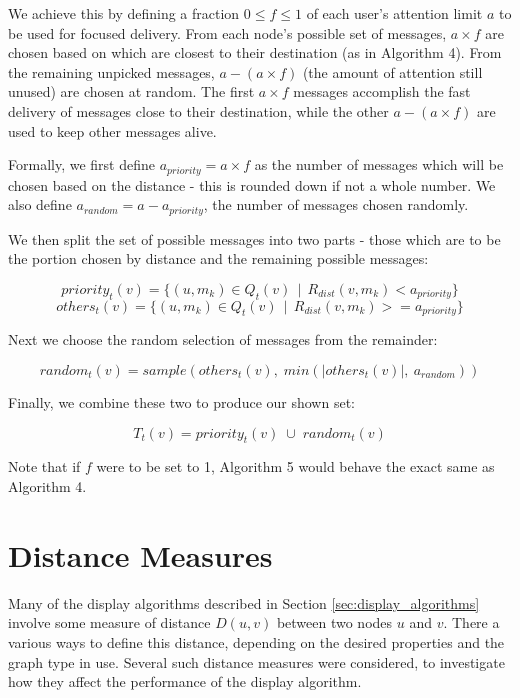 \documentclass[bsc,frontabs,twoside,singlespacing,parskip,deptreport]{infthesis}     %
\begin{document}
We achieve this by defining a fraction $0 \le f \le 1$ of each user's attention limit $a$ to be used for focused delivery. From each node's possible set of messages, $a \times f$ are chosen based on which are closest to their destination (as in Algorithm 4). From the remaining unpicked messages, $a - (a \times f)$ (the amount of attention still unused) are chosen at random. The first $a \times f$ messages accomplish the fast delivery of messages close to their destination, while the other $a - (a \times f)$ are used to keep other messages alive.

Formally, we first define $a_{priority} = a \times f$ as the number of messages which will be chosen based on the distance - this is rounded down if not a whole number. We also define $a_{random} = a - a_{priority}$, the number of messages chosen randomly.

We then split the set of possible messages into two parts - those which are to be the portion chosen by distance and the remaining possible messages:

\begin{equation}
priority_{t}(v) = \{ (u, m_{k}) \in Q_{t}(v) \:\: | \:\: R_{dist}(v, m_{k}) < a_{priority} \}
\end{equation}
\begin{equation}
others_{t}(v) = \{ (u, m_{k}) \in Q_{t}(v) \:\: | \:\: R_{dist}(v, m_{k}) >= a_{priority} \}
\end{equation}

Next we choose the random selection of messages from the remainder:

\begin{equation}
random_{t}(v) = \mathit{sample}(others_{t}(v), \; \mathit{min}(|others_{t}(v)|, \: a_{random}))
\end{equation}

Finally, we combine these two to produce our shown set:

\begin{equation}
T_{t}(v) = priority_{t}(v) \; \cup \; random_{t}(v)
\end{equation}

Note that if $f$ were to be set to 1, Algorithm 5 would behave the exact same as Algorithm 4.


\section{Distance Measures} \label{sec:distance_measures}
Many of the display algorithms described in Section \ref{sec:display_algorithms} involve some measure of distance $D(u, v)$ between two nodes $u$ and $v$. There a various ways to define this distance, depending on the desired properties and the graph type in use. Several such distance measures were considered, to investigate how they affect the performance of the display algorithm.
\end{document}
